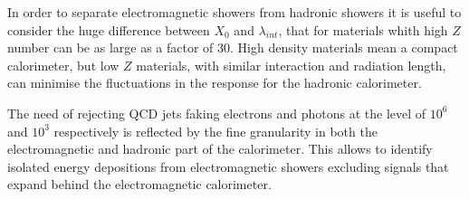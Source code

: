 
In order to separate electromagnetic showers from hadronic showers it is useful to consider the huge difference between $X_{0}$ and $\lambda_{int}$, that for materials whith high $Z$ number can be as large as a factor of 30. High density materials mean a compact calorimeter, but low $Z$ materials, with similar interaction and radiation length, can minimise the fluctuations in the response for the hadronic calorimeter. 

The need of rejecting QCD jets faking electrons and photons at the level of $10^{6}$ and $10^{3}$ respectively %
is reflected by the fine granularity in both the electromagnetic and hadronic part of the calorimeter. This allows to identify isolated energy depositions from electromagnetic showers excluding signals that expand behind the electromagnetic calorimeter. 

